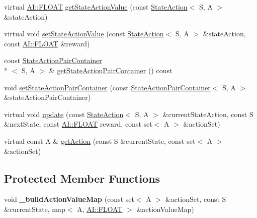 \begin{DoxyCompactItemize}
\item 
virtual \hyperlink{namespaceAI_a41b74884a20833db653dded3918e05c3}{A\-I\-::\-F\-L\-O\-A\-T} \hyperlink{classAI_1_1Algorithm_1_1ReinforcementLearning_ad078677d92b33df4ae7d3c78e040b766}{get\-State\-Action\-Value} (const \hyperlink{classAI_1_1StateAction}{State\-Action}$<$ S, A $>$ \&state\-Action)
\item 
virtual void \hyperlink{classAI_1_1Algorithm_1_1ReinforcementLearning_a5d576410235e5099f153d21f20a8e5af}{set\-State\-Action\-Value} (const \hyperlink{classAI_1_1StateAction}{State\-Action}$<$ S, A $>$ \&state\-Action, const \hyperlink{namespaceAI_a41b74884a20833db653dded3918e05c3}{A\-I\-::\-F\-L\-O\-A\-T} \&reward)
\item 
const \hyperlink{classAI_1_1StateActionPairContainer}{State\-Action\-Pair\-Container}\\*
$<$ S, A $>$ \& \hyperlink{classAI_1_1Algorithm_1_1ReinforcementLearning_a6b5fe1be9629bf5574d32ae4eeec33f5}{get\-State\-Action\-Pair\-Container} () const 
\item 
void \hyperlink{classAI_1_1Algorithm_1_1ReinforcementLearning_ad889f5f5949cac39d121f57e3027ad0c}{set\-State\-Action\-Pair\-Container} (const \hyperlink{classAI_1_1StateActionPairContainer}{State\-Action\-Pair\-Container}$<$ S, A $>$ \&state\-Action\-Pair\-Container)
\item 
virtual void \hyperlink{classAI_1_1Algorithm_1_1ReinforcementLearning_a25d7fa245a79e61061436dc0f1db90cb}{update} (const \hyperlink{classAI_1_1StateAction}{State\-Action}$<$ S, A $>$ \&current\-State\-Action, const S \&next\-State, const \hyperlink{namespaceAI_a41b74884a20833db653dded3918e05c3}{A\-I\-::\-F\-L\-O\-A\-T} reward, const set$<$ A $>$ \&action\-Set)
\item 
virtual const A \& \hyperlink{classAI_1_1Algorithm_1_1ReinforcementLearning_acb89c1734df6658a422af510b7c36377}{get\-Action} (const S \&current\-State, const set$<$ A $>$ \&action\-Set)
\end{DoxyCompactItemize}
\subsection*{Protected Member Functions}
\begin{DoxyCompactItemize}
\item 
\hypertarget{classAI_1_1Algorithm_1_1ReinforcementLearning_a3efc892a8b36ee3f878c86d15f30883f}{void {\bfseries \-\_\-build\-Action\-Value\-Map} (const set$<$ A $>$ \&action\-Set, const S \&current\-State, map$<$ A, \hyperlink{namespaceAI_a41b74884a20833db653dded3918e05c3}{A\-I\-::\-F\-L\-O\-A\-T} $>$ \&action\-Value\-Map)}\label{classAI_1_1Algorithm_1_1ReinforcementLearning_a3efc892a8b36ee3f878c86d15f30883f}

\end{DoxyCompactItemize}
